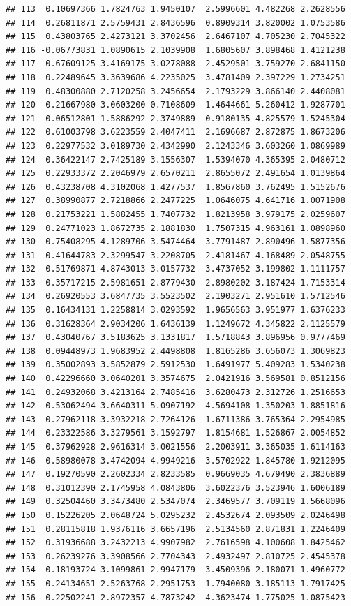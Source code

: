 \documentclass[
  11pt,
]{book}
\begin{document}
\begin{verbatim}
## 113  0.10697366 1.7824763 1.9450107  2.5996601 4.482268 2.2628556
## 114  0.26811871 2.5759431 2.8436596  0.8909314 3.820002 1.0753586
## 115  0.43803765 2.4273121 3.3702456  2.6467107 4.705230 2.7045322
## 116 -0.06773831 1.0890615 2.1039908  1.6805607 3.898468 1.4121238
## 117  0.67609125 3.4169175 3.0278088  2.4529501 3.759270 2.6841150
## 118  0.22489645 3.3639686 4.2235025  3.4781409 2.397229 1.2734251
## 119  0.48300880 2.7120258 3.2456654  2.1793229 3.866140 2.4408081
## 120  0.21667980 3.0603200 0.7108609  1.4644661 5.260412 1.9287701
## 121  0.06512801 1.5886292 2.3749889  0.9180135 4.825579 1.5245304
## 122  0.61003798 3.6223559 2.4047411  2.1696687 2.872875 1.8673206
## 123  0.22977532 3.0189730 2.4342990  2.1243346 3.603260 1.0869989
## 124  0.36422147 2.7425189 3.1556307  1.5394070 4.365395 2.0480712
## 125  0.22933372 2.2046979 2.6570211  2.8655072 2.491654 1.0139864
## 126  0.43238708 4.3102068 1.4277537  1.8567860 3.762495 1.5152676
## 127  0.38990877 2.7218866 2.2477225  1.0646075 4.641716 1.0071908
## 128  0.21753221 1.5882455 1.7407732  1.8213958 3.979175 2.0259607
## 129  0.24771023 1.8672735 2.1881830  1.7507315 4.963161 1.0898960
## 130  0.75408295 4.1289706 3.5474464  3.7791487 2.890496 1.5877356
## 131  0.41644783 2.3299547 3.2208705  2.4181467 4.168489 2.0548755
## 132  0.51769871 4.8743013 3.0157732  3.4737052 3.199802 1.1111757
## 133  0.35717215 2.5981651 2.8779430  2.8980202 3.187424 1.7153314
## 134  0.26920553 3.6847735 3.5523502  2.1903271 2.951610 1.5712546
## 135  0.16434131 1.2258814 3.0293592  1.9656563 3.951977 1.6376233
## 136  0.31628364 2.9034206 1.6436139  1.1249672 4.345822 2.1125579
## 137  0.43040767 3.5183625 3.1331817  1.5718843 3.896956 0.9777469
## 138  0.09448973 1.9683952 2.4498808  1.8165286 3.656073 1.3069823
## 139  0.35002893 3.5852879 2.5912530  1.6491977 5.409283 1.5340238
## 140  0.42296660 3.0640201 3.3574675  2.0421916 3.569581 0.8512156
## 141  0.24932068 3.4213164 2.7485416  3.6280473 2.312726 1.2516653
## 142  0.53062494 3.6640311 5.0907192  4.5694108 1.350203 1.8851816
## 143  0.27962118 3.3932218 2.7264126  1.6711386 3.765364 2.2954985
## 144  0.23322586 3.3279561 3.1592797  1.8154681 1.526867 2.0054852
## 145  0.37962928 2.9616314 3.0021556  2.2003911 3.365035 1.6114163
## 146  0.58980078 3.4742094 4.9949216  3.5702922 1.845780 1.9212095
## 147  0.19270590 2.2602334 2.8233585  0.9669035 4.679490 2.3836889
## 148  0.31012390 2.1745958 4.0843806  3.6022376 3.523946 1.6006189
## 149  0.32504460 3.3473480 2.5347074  2.3469577 3.709119 1.5668096
## 150  0.15226205 2.0648724 5.0295232  2.4532674 2.093509 2.0246498
## 151  0.28115818 1.9376116 3.6657196  2.5134560 2.871831 1.2246409
## 152  0.31936688 3.2432213 4.9907982  2.7616598 4.100608 1.8425462
## 153  0.26239276 3.3908566 2.7704343  2.4932497 2.810725 2.4545378
## 154  0.18193724 3.1099861 2.9947179  3.4509396 2.180071 1.4960772
## 155  0.24134651 2.5263768 2.2951753  1.7940080 3.185113 1.7917425
## 156  0.22502241 2.8972357 4.7873242  4.3623474 1.775025 1.0875423
\end{verbatim}
\end{document}
